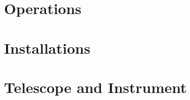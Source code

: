 \documentclass{report}
\begin{document}



\part{Operations}





\part{Installations}










\part{Telescope and Instrument}




\end{document}
